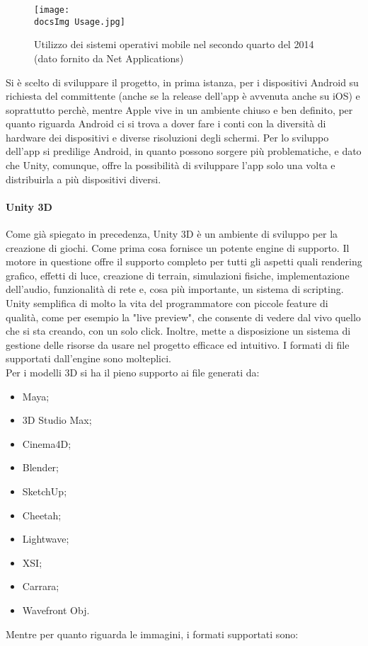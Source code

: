 \begin{figure}[H]
	\centering
	\texttt{[image: \\docsImg Usage.jpg]}
	\caption{Utilizzo dei sistemi operativi mobile nel secondo quarto del 2014 (dato fornito da Net Applications)}
	\label{fig:Utilizzo dei sistemi operativi mobile nel secondo quarto del 2014}
\end{figure}

Si \`e scelto di sviluppare il progetto, in prima istanza, per i dispositivi Android su richiesta del committente (anche se la release dell'app \`e avvenuta anche su iOS) e soprattutto perch\`e, mentre Apple vive in un ambiente chiuso e ben definito, per quanto riguarda Android ci si trova a dover fare i conti con la diversit\`a di hardware dei dispositivi e diverse risoluzioni degli schermi. Per lo sviluppo dell'app si predilige Android, in quanto possono sorgere pi\`u problematiche, e dato che Unity, comunque, offre la possibilit\`a di sviluppare l'app solo una volta e distribuirla a pi\`u dispositivi diversi.


\paragraph{Unity 3D}
Come gi\`a spiegato in precedenza, Unity 3D è un ambiente di sviluppo per la creazione di giochi. Come prima cosa fornisce un potente engine di supporto. Il motore in questione offre il supporto completo per tutti gli aspetti quali rendering grafico, effetti di luce, creazione di terrain, simulazioni fisiche, implementazione dell’audio, funzionalità di rete e, cosa pi\`u importante, un sistema di scripting.
Unity semplifica di molto la vita del programmatore con piccole feature di qualit\`a, come per esempio la "live preview", che consente di vedere dal vivo quello che si sta creando, con un solo click. Inoltre, mette a disposizione un sistema di gestione delle risorse da usare nel progetto efficace ed intuitivo.
I formati di file supportati dall'engine sono molteplici. 
\\Per i modelli 3D si ha il pieno supporto ai file generati da:

\begin{multicols}{3}
\begin{itemize}
	\item Maya;
	\item 3D Studio Max;
	\item Cinema4D;
	\item Blender;
	\item SketchUp;
	\item Cheetah;
	\item Lightwave;
	\item XSI;
	\item Carrara;
	\item Wavefront Obj.
\end{itemize}
\end{multicols}
Mentre per quanto riguarda le immagini, i formati supportati sono:

